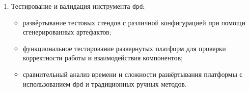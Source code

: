 \begin{enumerate}[1.]
    \item Тестирование и валидация инструмента \texttt{dpd}:
          \begin{itemize}
              \item развёртывание тестовых стендов с различной конфигурацией при помощи сгенерированных артефактов;
              \item функциональное тестирование развернутых платформ для проверки корректности работы и взаимодействия компонентов;
              \item сравнительный анализ времени и сложности развёртывания платформы с использованием \texttt{dpd} и традиционных ручных методов.
          \end{itemize}
\end{enumerate}
